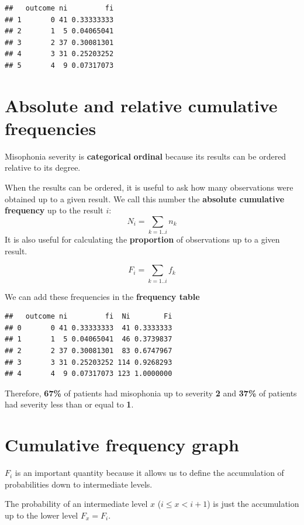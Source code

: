 \documentclass[
]{book}
\begin{document}
\begin{verbatim}
##   outcome ni         fi
## 1       0 41 0.33333333
## 2       1  5 0.04065041
## 3       2 37 0.30081301
## 4       3 31 0.25203252
## 5       4  9 0.07317073
\end{verbatim}

\hypertarget{absolute-and-relative-cumulative-frequencies}{%
\section{Absolute and relative cumulative frequencies}\label{absolute-and-relative-cumulative-frequencies}}

Misophonia severity is \textbf{categorical} \textbf{ordinal} because its results can be ordered relative to its degree.

When the results can be ordered, it is useful to ask how many observations were obtained up to a given result. We call this number the \textbf{absolute cumulative frequency} up to the result \(i\):
\[N_i =\sum_{k= 1..i } n_k\]
It is also useful for calculating the \textbf{proportion} of observations up to a given result.

\[F_i =\sum_{k= 1..i } f_k\]

We can add these frequencies in the \textbf{frequency table}

\begin{verbatim}
##   outcome ni         fi  Ni        Fi
## 0       0 41 0.33333333  41 0.3333333
## 1       1  5 0.04065041  46 0.3739837
## 2       2 37 0.30081301  83 0.6747967
## 3       3 31 0.25203252 114 0.9268293
## 4       4  9 0.07317073 123 1.0000000
\end{verbatim}

Therefore, \textbf{67\%} of patients had misophonia up to severity \textbf{2} and \textbf{37\%} of patients had severity less than or equal to \textbf{1}.

\hypertarget{cumulative-frequency-graph}{%
\section{Cumulative frequency graph}\label{cumulative-frequency-graph}}

\(F_i\) is an important quantity because it allows us to define the accumulation of probabilities down to intermediate levels.

The probability of an intermediate level \(x\) (\(i\leq x< i+1\)) is just the accumulation up to the lower level \(F_x = F_i\).
\end{document}
